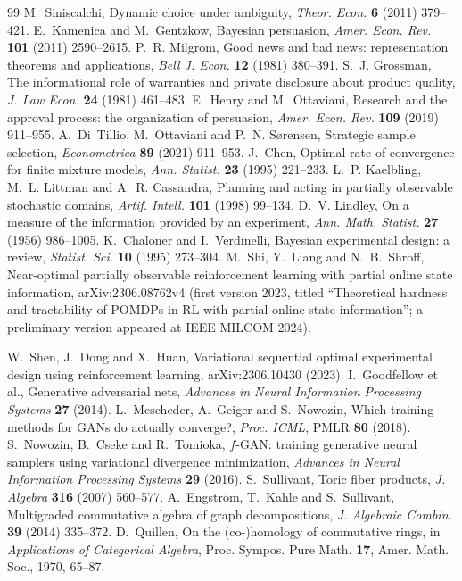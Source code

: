 \documentclass[11pt]{article}
\theoremstyle{definition}\newtheorem{definition}{Definition}\newtheorem{remark}{Remark}
\begin{document}
\begin{thebibliography}{99}
 M.~Siniscalchi, Dynamic choice under ambiguity, \emph{Theor. Econ.} \textbf{6} (2011) 379--421.
 E.~Kamenica and M.~Gentzkow, Bayesian persuasion, \emph{Amer. Econ. Rev.} \textbf{101} (2011) 2590--2615.
 P.~R. Milgrom, Good news and bad news: representation theorems and applications, \emph{Bell J. Econ.} \textbf{12} (1981) 380--391.
 S.~J. Grossman, The informational role of warranties and private disclosure about product quality, \emph{J. Law Econ.} \textbf{24} (1981) 461--483.
 E.~Henry and M.~Ottaviani, Research and the approval process: the organization of persuasion, \emph{Amer. Econ. Rev.} \textbf{109} (2019) 911--955.
 A.~Di~Tillio, M.~Ottaviani and P.~N. Sørensen, Strategic sample selection, \emph{Econometrica} \textbf{89} (2021) 911--953.
 J.~Chen, Optimal rate of convergence for finite mixture models, \emph{Ann. Statist.} \textbf{23} (1995) 221--233.
 L.~P. Kaelbling, M.~L. Littman and A.~R. Cassandra, Planning and acting in partially observable stochastic domains, \emph{Artif. Intell.} \textbf{101} (1998) 99--134.
 D.~V. Lindley, On a measure of the information provided by an experiment, \emph{Ann. Math. Statist.} \textbf{27} (1956) 986--1005.
 K.~Chaloner and I.~Verdinelli, Bayesian experimental design: a review, \emph{Statist. Sci.} \textbf{10} (1995) 273--304.
 M.~Shi, Y.~Liang and N.~B.~Shroff, Near-optimal partially observable reinforcement learning with partial online state information, arXiv:2306.08762v4 (first version 2023, titled ``Theoretical hardness and tractability of POMDPs in RL with partial online state information''; a preliminary version appeared at IEEE MILCOM 2024).

 W.~Shen, J.~Dong and X.~Huan, Variational sequential optimal experimental design using reinforcement learning, arXiv:2306.10430 (2023).
 I.~Goodfellow et al., Generative adversarial nets, \emph{Advances in Neural Information Processing Systems} \textbf{27} (2014).
 L.~Mescheder, A.~Geiger and S.~Nowozin, Which training methods for GANs do actually converge?, \emph{Proc. ICML}, PMLR \textbf{80} (2018).
 S.~Nowozin, B.~Cseke and R.~Tomioka, $f$-GAN: training generative neural samplers using variational divergence minimization, \emph{Advances in Neural Information Processing Systems} \textbf{29} (2016).
 S.~Sullivant, Toric fiber products, \emph{J. Algebra} \textbf{316} (2007) 560--577.
 A.~Engström, T.~Kahle and S.~Sullivant, Multigraded commutative algebra of graph decompositions, \emph{J. Algebraic Combin.} \textbf{39} (2014) 335--372.
 D.~Quillen, On the (co-)homology of commutative rings, in \emph{Applications of Categorical Algebra}, Proc. Sympos. Pure Math. \textbf{17}, Amer. Math. Soc., 1970, 65--87.


\end{thebibliography}
\end{document}
